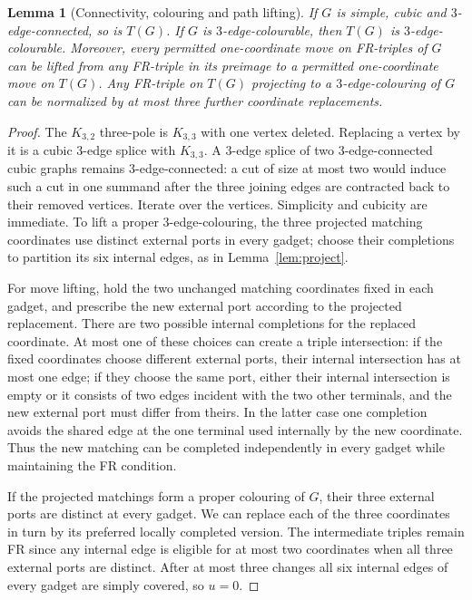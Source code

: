\documentclass[11pt]{article}
\newtheorem{lemma}{Lemma}
\begin{document}
\begin{lemma}[Connectivity, colouring and path lifting]\label{lem:lift}
If $G$ is simple, cubic and $3$-edge-connected, so is $T(G)$. If $G$ is $3$-edge-colourable, then $T(G)$ is $3$-edge-colourable. Moreover, every permitted one-coordinate move on FR-triples of $G$ can be lifted from \emph{any} FR-triple in its preimage to a permitted one-coordinate move on $T(G)$. Any FR-triple on $T(G)$ projecting to a $3$-edge-colouring of $G$ can be normalized by at most three further coordinate replacements.
\end{lemma}
\begin{proof}
The $K_{3,2}$ three-pole is $K_{3,3}$ with one vertex deleted. Replacing a vertex by it is a cubic $3$-edge splice with $K_{3,3}$. A $3$-edge splice of two $3$-edge-connected cubic graphs remains $3$-edge-connected: a cut of size at most two would induce such a cut in one summand after the three joining edges are contracted back to their removed vertices. Iterate over the vertices. Simplicity and cubicity are immediate. To lift a proper $3$-edge-colouring, the three projected matching coordinates use distinct external ports in every gadget; choose their completions to partition its six internal edges, as in Lemma~\ref{lem:project}.

For move lifting, hold the two unchanged matching coordinates fixed in each gadget, and prescribe the new external port according to the projected replacement. There are two possible internal completions for the replaced coordinate. At most one of these choices can create a triple intersection: if the fixed coordinates choose different external ports, their internal intersection has at most one edge; if they choose the same port, either their internal intersection is empty or it consists of two edges incident with the two other terminals, and the new external port must differ from theirs. In the latter case one completion avoids the shared edge at the one terminal used internally by the new coordinate. Thus the new matching can be completed independently in every gadget while maintaining the FR condition.

If the projected matchings form a proper colouring of $G$, their three external ports are distinct at every gadget. We can replace each of the three coordinates in turn by its preferred locally completed version. The intermediate triples remain FR since any internal edge is eligible for at most two coordinates when all three external ports are distinct. After at most three changes all six internal edges of every gadget are simply covered, so $u=0$.
\end{proof}
\end{document}
